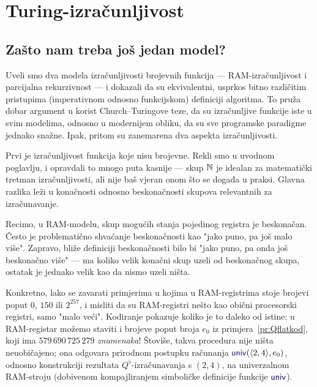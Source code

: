 \chapter{Turing-izračunljivost}\label{ch:Turing}

\section{Zašto nam treba još jedan model?}

Uveli smo dva modela izračunljivosti brojevnih funkcija --- RAM-izračunljivost i parcijalna rekurzivnost --- i dokazali da su ekvivalentni, usprkos bitno različitim pristupima (imperativnom odnosno funkcijskom) definiciji algoritma. To pruža dobar argument u korist Church--\!Turingove teze, da su izračunljive funkcije iste u svim modelima, odnosno u modernijem obliku, da su sve programske paradigme jednako snažne. Ipak, pritom su zanemarena dva aspekta izračunljivosti.


Prvi je izračunljivost funkcija koje nisu brojevne. Rekli smo u uvodnom poglavlju, i opravdali to mnogo puta kasnije --- skup ${\mathbb N}$ je idealan za matematički tretman izračunljivosti, ali nije baš vjeran onom što se događa u praksi. Glavna razlika leži u konačnosti odnosno beskonačnosti skupova relevantnih za izračunavanje.

Recimo, u RAM-modelu, skup mogućih stanja pojedinog registra je beskonačan. Često je problematično shvaćanje beskonačnosti kao "jako puno, pa još malo više". Zapravo, bliže definiciji beskonačnosti bilo bi "jako puno, pa onda još beskonačno više" --- ma koliko velik konačni skup uzeli od beskonačnog skupa, ostatak je jednako velik kao da nismo uzeli ništa.

Konkretno, lako se zavarati primjerima u kojima u RAM-registrima stoje brojevi poput $0$, $150$ ili $2^{257}$, i misliti da su RAM-registri nešto kao obični procesorski registri, samo "malo veći". Kodiranje pokazuje koliko je to daleko od istine: u RAM-registar možemo staviti i brojeve poput broja $e_0$ iz primjera~\ref{pr:Qflatkod}, koji ima $579\,690\,725\,279$ \emph{znamenaka}! Štoviše, takva procedura nije ništa neuobičajeno; ona odgovara prirodnom postupku računanja $\f{univ}(\kr{2,4},e_0)$, odnosno konstrukciji rezultata $Q^\flat$-izračunavanja s $(2,4)$, na univerzalnom RAM-stroju (dobivenom kompajliranjem simboličke definicije funkcije $\f{univ}$).

